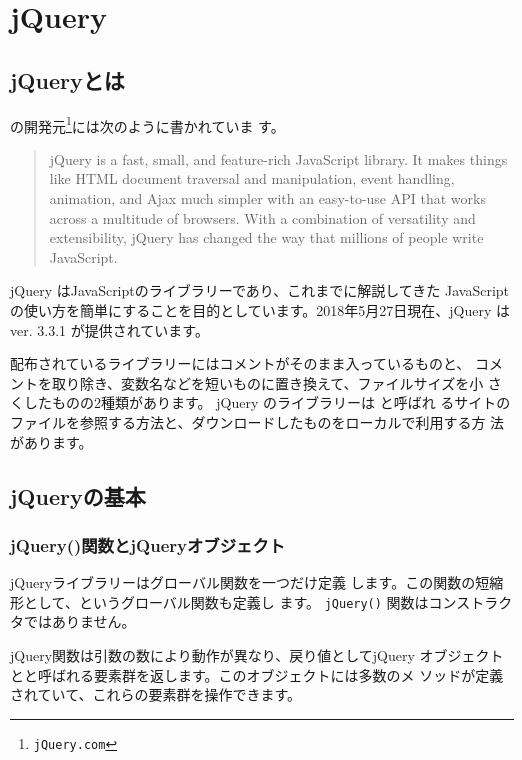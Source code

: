 \section{jQuery}
\subsection{jQueryとは}
 の開発元\footnote{\texttt{jQuery.com}}には次のように書かれていま
す。
\begin{quotation}
jQuery is a fast, small, and feature-rich JavaScript library. It makes
 things like HTML document traversal and manipulation, event handling,
 animation, and Ajax much simpler with an easy-to-use API that works
 across a multitude of browsers. With a combination of versatility and
 extensibility, jQuery has changed the way that millions of people write
 JavaScript.
\end{quotation}
jQuery はJavaScriptのライブラリーであり、これまでに解説してきた
JavaScriptの使い方を簡単にすることを目的としています。2018年5月27日現在、jQuery
は ver. 3.3.1 が提供されています。

配布されているライブラリーにはコメントがそのまま入っているものと、
コメントを取り除き、変数名などを短いものに置き換えて、ファイルサイズを小
さくしたものの2種類があります。
%
jQuery のライブラリーは と呼ばれ
るサイトのファイルを参照する方法と、ダウンロードしたものをローカルで利用する方
法があります。 
\newcommand{\FuncRef}[1]{%
\refstepcounter{Func}\label{#1}({\bfseries 機能\arabic{Func}})}
\subsection{jQueryの基本}
\subsubsection{jQuery()関数とjQueryオブジェクト}
jQueryライブラリーはグローバル関数を一つだけ定義
します。この関数の短縮形として、\ElmJ{\$}というグローバル関数も定義し
ます。
\texttt{jQuery()} 関数はコンストラクタではありません。

jQuery関数は引数の数により動作が異なり、戻り値としてjQuery
オブジェクトとと呼ばれる要素群を返します。このオブジェクトには多数のメ
ソッドが定義されていて、これらの要素群を操作できます。

